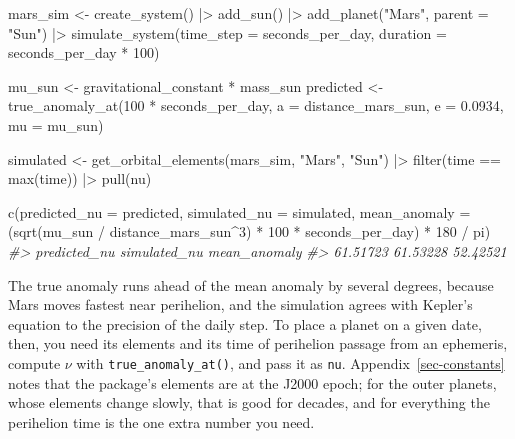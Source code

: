 \documentclass[
  10.5pt,
  letterpaper,
]{scrbook}
\newenvironment{Shaded}{\begin{snugshade}}{\end{snugshade}}
\newcommand{\AttributeTok}[1]{\textcolor[rgb]{0.00,0.00,0.00}{#1}}
\newcommand{\CommentTok}[1]{\textcolor[rgb]{0.00,0.00,0.00}{\textit{#1}}}
\newcommand{\DecValTok}[1]{\textcolor[rgb]{0.00,0.00,0.00}{#1}}
\newcommand{\FloatTok}[1]{\textcolor[rgb]{0.00,0.00,0.00}{#1}}
\newcommand{\FunctionTok}[1]{\textcolor[rgb]{0.00,0.00,0.00}{#1}}
\newcommand{\NormalTok}[1]{\textcolor[rgb]{0.00,0.00,0.00}{#1}}
\newcommand{\OtherTok}[1]{\textcolor[rgb]{0.00,0.00,0.00}{#1}}
\newcommand{\SpecialCharTok}[1]{\textcolor[rgb]{0.00,0.00,0.00}{#1}}
\newcommand{\StringTok}[1]{\textcolor[rgb]{0.00,0.00,0.00}{#1}}
\theoremstyle{plain}
\theoremstyle{remark}
\begin{document}
\begin{Shaded}
\begin{Highlighting}[]
\NormalTok{mars\_sim }\OtherTok{\textless{}{-}} \FunctionTok{create\_system}\NormalTok{() }\SpecialCharTok{|\textgreater{}}
  \FunctionTok{add\_sun}\NormalTok{() }\SpecialCharTok{|\textgreater{}}
  \FunctionTok{add\_planet}\NormalTok{(}\StringTok{"Mars"}\NormalTok{, }\AttributeTok{parent =} \StringTok{"Sun"}\NormalTok{) }\SpecialCharTok{|\textgreater{}}
  \FunctionTok{simulate\_system}\NormalTok{(}\AttributeTok{time\_step =}\NormalTok{ seconds\_per\_day, }\AttributeTok{duration =}\NormalTok{ seconds\_per\_day }\SpecialCharTok{*} \DecValTok{100}\NormalTok{)}

\NormalTok{mu\_sun }\OtherTok{\textless{}{-}}\NormalTok{ gravitational\_constant }\SpecialCharTok{*}\NormalTok{ mass\_sun}
\NormalTok{predicted }\OtherTok{\textless{}{-}} \FunctionTok{true\_anomaly\_at}\NormalTok{(}\DecValTok{100} \SpecialCharTok{*}\NormalTok{ seconds\_per\_day,}
                             \AttributeTok{a =}\NormalTok{ distance\_mars\_sun, }\AttributeTok{e =} \FloatTok{0.0934}\NormalTok{, }\AttributeTok{mu =}\NormalTok{ mu\_sun)}

\NormalTok{simulated }\OtherTok{\textless{}{-}} \FunctionTok{get\_orbital\_elements}\NormalTok{(mars\_sim, }\StringTok{"Mars"}\NormalTok{, }\StringTok{"Sun"}\NormalTok{) }\SpecialCharTok{|\textgreater{}}
  \FunctionTok{filter}\NormalTok{(time }\SpecialCharTok{==} \FunctionTok{max}\NormalTok{(time)) }\SpecialCharTok{|\textgreater{}}
  \FunctionTok{pull}\NormalTok{(nu)}

\FunctionTok{c}\NormalTok{(}\AttributeTok{predicted\_nu =}\NormalTok{ predicted, }\AttributeTok{simulated\_nu =}\NormalTok{ simulated,}
  \AttributeTok{mean\_anomaly =}\NormalTok{ (}\FunctionTok{sqrt}\NormalTok{(mu\_sun }\SpecialCharTok{/}\NormalTok{ distance\_mars\_sun}\SpecialCharTok{\^{}}\DecValTok{3}\NormalTok{) }\SpecialCharTok{*} \DecValTok{100} \SpecialCharTok{*}
\NormalTok{                    seconds\_per\_day) }\SpecialCharTok{*} \DecValTok{180} \SpecialCharTok{/}\NormalTok{ pi)}
\CommentTok{\#\textgreater{} predicted\_nu simulated\_nu mean\_anomaly }
\CommentTok{\#\textgreater{}     61.51723     61.53228     52.42521}
\end{Highlighting}
\end{Shaded}

The true anomaly runs ahead of the mean anomaly by several degrees,
because Mars moves fastest near perihelion, and the simulation agrees
with Kepler's equation to the precision of the daily step. To place a
planet on a given date, then, you need its elements and its time of
perihelion passage from an ephemeris, compute \(\nu\) with
\texttt{true\_anomaly\_at()}, and pass it as \texttt{nu}.
Appendix~\ref{sec-constants} notes that the package's elements are at
the J2000 epoch; for the outer planets, whose elements change slowly,
that is good for decades, and for everything the perihelion time is the
one extra number you need.
\end{document}
